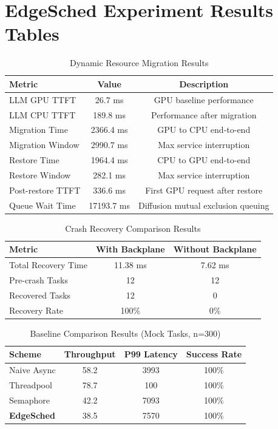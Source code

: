 \documentclass{article}
\begin{document}
\section*{EdgeSched Experiment Results Tables}

\begin{table}[h]
\centering
\caption{Dynamic Resource Migration Results}
\label{tab:migration}
\begin{tabular}{lcc}
\toprule
\textbf{Metric} & \textbf{Value} & \textbf{Description} \\
\midrule
LLM GPU TTFT & 26.7 ms & GPU baseline performance \\
LLM CPU TTFT & 189.8 ms & Performance after migration \\
Migration Time & 2366.4 ms & GPU to CPU end-to-end \\
Migration Window & 2990.7 ms & Max service interruption \\
\midrule
Restore Time & 1964.4 ms & CPU to GPU end-to-end \\
Restore Window & 282.1 ms & Max service interruption \\
Post-restore TTFT & 336.6 ms & First GPU request after restore \\
\midrule
Queue Wait Time & 17193.7 ms & Diffusion mutual exclusion queuing \\
\bottomrule
\end{tabular}
\end{table}

\begin{table}[h]
\centering
\caption{Crash Recovery Comparison Results}
\label{tab:crash_recovery}
\begin{tabular}{lcc}
\toprule
\textbf{Metric} & \textbf{With Backplane} & \textbf{Without Backplane} \\
\midrule
Total Recovery Time & 11.38 ms & 7.62 ms \\
Pre-crash Tasks & 12 & 12 \\
Recovered Tasks & 12 & 0 \\
Recovery Rate & 100\% & 0\% \\
\bottomrule
\end{tabular}
\end{table}

\begin{table}[h]
\centering
\caption{Baseline Comparison Results (Mock Tasks, n=300)}
\label{tab:baseline}
\begin{tabular}{lccc}
\toprule
\textbf{Scheme} & \textbf{Throughput} & \textbf{P99 Latency} & \textbf{Success Rate} \\
\midrule
Naive Async & 58.2 & 3993 & 100\% \\
Threadpool & 78.7 & 100 & 100\% \\
Semaphore & 42.2 & 7093 & 100\% \\
\textbf{EdgeSched} & 38.5 & 7570 & 100\% \\
\bottomrule
\end{tabular}
\end{table}
\end{document}
